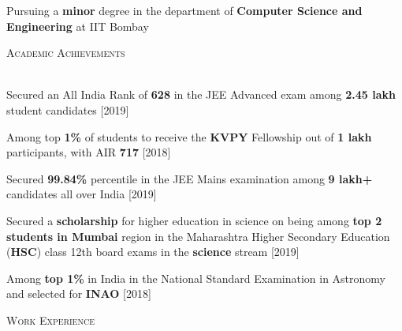 \documentclass[11pt]{article}
\renewcommand{\section}[1]{
    \vspace*{8pt}
    \textsc{\LARGE{#1}}
    \vspace*{-10pt} \\ \hspace*{-5pt} 
    \hrulefill \\
    \vspace*{-15pt}
    \vspace*{-8pt}
}
\newcommand{\smallbullet}{
    \small$\bullet$
}
\newenvironment{bullet-list-major}{
    \vspace*{8pt}
    \begin{list}{
        \smallbullet
    }{
        \setlength\leftmargin{15pt}\topsep -5pt \itemsep -6pt
    }
} {
    \end{list}
}
\begin{document}
    \vspace*{48.63mm}



    \vspace{-20pt}
    Pursuing a \textbf{minor} degree in the department of \textbf{Computer Science and Engineering} at IIT Bombay
    \vspace{-10pt}

    \section{Academic Achievements}
    \begin{bullet-list-major}
        \item Secured an All India Rank of \textbf{628} in the JEE Advanced exam among \textbf{2.45 lakh} student candidates \hfill [2019]
        \item Among top \textbf{1\%} of students to receive the \textbf{KVPY} Fellowship out of \textbf{1 lakh} participants, with AIR \textbf{717}  \hfill [2018]
        \item Secured \textbf{99.84\%} percentile in the JEE Mains examination among \textbf{9 lakh+} candidates all over India \hfill [2019]
        \item Secured a \textbf{scholarship} for higher education in science on being among \textbf{top 2 students in Mumbai} region in the Maharashtra Higher Secondary Education (\textbf{HSC}) class 12th board exams in the \textbf{science} stream   \hfill [2019]
        \item Among \textbf{top 1\%} in India in the National Standard Examination in Astronomy and selected for \textbf{INAO} \hfill [2018]
    \end{bullet-list-major}


    \section{Work Experience}
\end{document}

